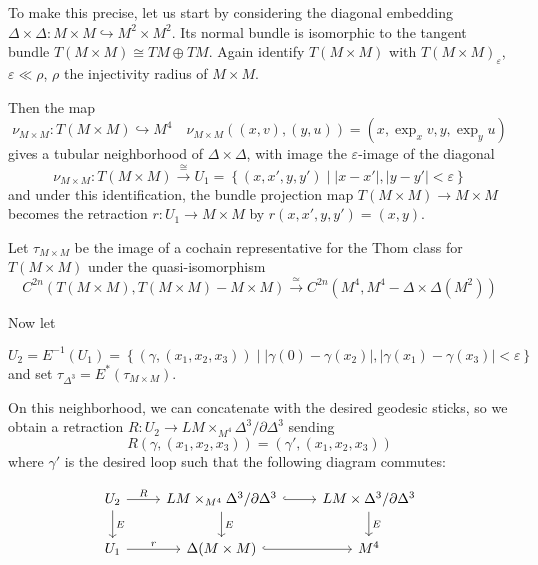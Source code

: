 \documentclass[reqno]{amsart}
\theoremstyle{definition}
\theoremstyle{remark}
\begin{document}
To make this precise, let us start by
considering the diagonal embedding
$\Delta \times \Delta \colon M \times M 
\hookrightarrow M^2 \times M^2$.
Its normal bundle is isomorphic to
the tangent bundle $T(M \times M) \cong TM \oplus TM$.
Again identify $T\left( M \times M \right) $ with
$T\left( M \times M \right)_{\varepsilon}$,
$\varepsilon \ll \rho$, $\rho$ the injectivity radius of $M \times M$.

Then the map
\[
\nu_{M \times M} \colon T\left( M \times M \right) 
\hookrightarrow M^{4} \quad
\nu_{M \times M}\left( \left( x,v \right) ,
\left( y,u \right) \right) =
\left( x, \exp_x v, y, \exp_y u \right) 
\] 
gives a tubular neighborhood
of $\Delta \times \Delta$, with image the
$\varepsilon$-image of the diagonal
\[
\nu_{M \times M} \colon T\left( M \times M \right) 
\stackrel{\cong}{\to} U_1 
= \left\{ \left( x,x',y,y' \right)  \mid 
\left| x-x' \right| , \left| y-y' \right| < \varepsilon \right\} 
\] 
and under this identification, the bundle projection
map $T\left( M \times M \right) \to M \times M$ becomes
the retraction
$r \colon U_1 \to M \times M$ by
$r\left( x,x',y,y' \right) = \left( x,y \right) $.

Let
$\tau_{M \times M}$ be the image of a cochain representative
for the Thom class for
$T\left( M \times M \right) $ under
the quasi-isomorphism
\[
C^{2n}\left( T(M \times M), T(M \times M) - M \times M \right) 
\stackrel{\simeq}{\to} 
C^{2n} \left( M^{4}, M^{4} - \Delta \times \Delta(M^2) \right) 
\] 

Now let

\[
    U_{2} = E^{-1}(U_1) = 
    \left\{ \left( \gamma, \left( x_1,x_2,x_3 \right)  \right)  \mid 
    \left| \gamma(0) - \gamma(x_2) \right| ,
    \left| \gamma(x_1)- \gamma(x_3) \right| < \varepsilon \right\} 
\]
and set
$\tau_{\Delta^3} = 
E^{*}(\tau_{M \times M})$.



On this neighborhood, we can concatenate with the desired geodesic sticks,
so we obtain a retraction
$R \colon U_2 \to LM \times_{M^{4}} \Delta^3 / \partial \Delta^3$ sending
\[
R (\gamma, \left( x_1,x_2,x_3 \right) )
= \left( \gamma', \left( x_1,x_2,x_3 \right)  \right) 
\] 
where $\gamma'$ is the desired loop
such that
the following diagram commutes:

\begin{equation*}
\begin{tikzcd}
    U_2 \ar[d, "E"] \ar[r, "R"] & LM \times_{M^{4}} \Delta^3 / \partial \Delta^3
    \ar[r, hookrightarrow] \ar[d, "E"] & LM \times \Delta^3 / 
    \partial \Delta^3 \ar[d, "E"] \\
    U_1 \ar[r, "r"] & \Delta (M \times M) \ar[r, hookrightarrow] & M^{4}
\end{tikzcd}
\end{equation*}
\end{document}

